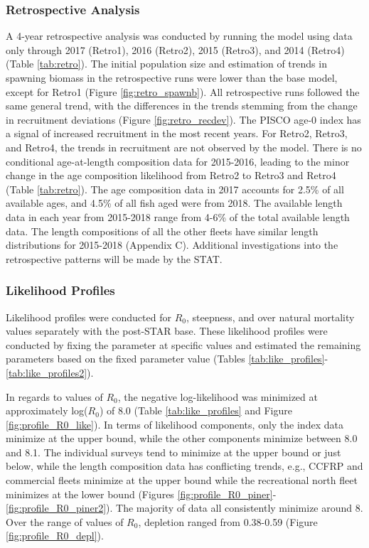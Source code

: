 \documentclass[12pt,]{article}
\begin{document}
\subsubsection{Retrospective Analysis}\label{retrospective-analysis}

A 4-year retrospective analysis was conducted by running the model using
data only through 2017 (Retro1), 2016 (Retro2), 2015 (Retro3), and 2014
(Retro4) (Table \ref{tab:retro}). The initial population size and
estimation of trends in spawning biomass in the retrospective runs were
lower than the base model, except for Retro1 (Figure
\ref{fig:retro_spawnb}). All retrospective runs followed the same
general trend, with the differences in the trends stemming from the
change in recruitment deviations (Figure \ref{fig:retro_recdev}). The
PISCO age-0 index has a signal of increased recruitment in the most
recent years. For Retro2, Retro3, and Retro4, the trends in recruitment
are not observed by the model. There is no conditional age-at-length
composition data for 2015-2016, leading to the minor change in the age
composition likelihood from Retro2 to Retro3 and Retro4 (Table
\ref{tab:retro}). The age composition data in 2017 accounts for 2.5\% of
all available ages, and 4.5\% of all fish aged were from 2018. The
available length data in each year from 2015-2018 range from 4-6\% of
the total available length data. The length compositions of all the
other fleets have similar length distributions for 2015-2018 (Appendix
C). Additional investigations into the retrospective patterns will be
made by the STAT.

\subsubsection{Likelihood Profiles}\label{likelihood-profiles}

Likelihood profiles were conducted for \(R_0\), steepness, and over
natural mortality values separately with the post-STAR base. These
likelihood profiles were conducted by fixing the parameter at specific
values and estimated the remaining parameters based on the fixed
parameter value (Tables
\ref{tab:like_profiles}-\ref{tab:like_profiles2}).

In regards to values of \(R_0\), the negative log-likelihood was
minimized at approximately log(\(R_0\)) of 8.0 (Table
\ref{tab:like_profiles} and Figure \ref{fig:profile_R0_like}). In terms
of likelihood components, only the index data minimize at the upper
bound, while the other components minimize between 8.0 and 8.1. The
individual surveys tend to minimize at the upper bound or just below,
while the length composition data has conflicting trends, e.g., CCFRP
and commercial fleets minimize at the upper bound while the recreational
north fleet minimizes at the lower bound (Figures
\ref{fig:profile_R0_piner}-\ref{fig:profile_R0_piner2}). The majority of
data all consistently minimize around 8. Over the range of values of
\(R_0\), depletion ranged from 0.38-0.59 (Figure
\ref{fig:profile_R0_depl}).
\end{document}
